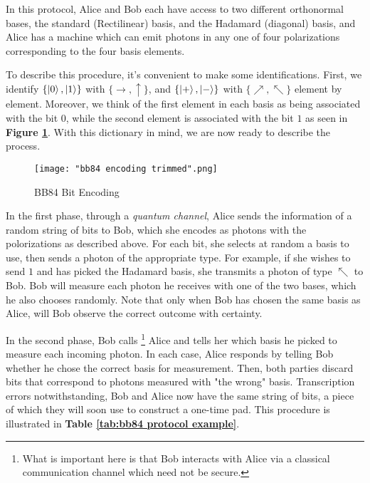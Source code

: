 In this protocol, Alice and Bob each have access to two different orthonormal bases, the standard (Rectilinear) basis, and the Hadamard (diagonal) basis, and Alice has a machine which can emit photons in any one of four polarizations corresponding to the four basis elements.  

To describe this procedure, it's convenient to make some identifications.  First, we identify $\{\ket{0},\ket{1}\}$ with $\{\rightarrow, \uparrow\}$, and $\{\ket{+}, \ket{-}\}$ with $\{\nearrow, \nwarrow\}$ element by element.  Moreover, we think of the first element in each basis as being associated with the bit $0$, while the second element is associated with the bit $1$ as seen in \textbf{Figure \ref{fig:BB84 bit encoding}}.  With this dictionary in mind, we are now ready to describe the process.

\begin{figure}[h]
    \centering
    \texttt{[image: "bb84 encoding trimmed".png]}
    \caption{BB84 Bit Encoding \protect\footnotemark}
    \label{fig:BB84 bit encoding}
\end{figure}



In the first phase, through a {\emph{quantum channel}}, Alice sends the information of a random string of bits to Bob, which she encodes as photons with the polorizations as described above. For each bit, she selects at random a basis to use, then sends a photon of the appropriate type.  For example, if she wishes to send $1$ and has picked the Hadamard basis, she transmits a photon of type $\nwarrow$ to Bob.  Bob will measure each photon he receives with one of the two bases, which he also chooses randomly. Note that only when Bob has chosen the same basis as Alice, will Bob observe the correct outcome with certainty.  

In the second phase, Bob calls \footnote{What is important here is that Bob interacts with Alice via a classical communication channel which need not be secure.} Alice and tells her which basis he picked to measure each incoming photon. In each case, Alice responds by telling Bob whether he chose the correct basis for measurement. Then, both parties discard bits that correspond to photons measured with "the wrong" basis. Transcription errors notwithstanding, Bob and Alice now have the same string of bits, a piece of which they will soon use to construct a one-time pad.  This procedure is illustrated in \textbf{Table \ref{tab:bb84 protocol example}}.


